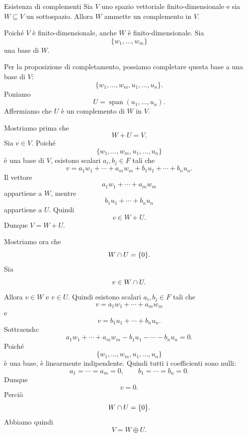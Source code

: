 \documentclass[a4paper]{article}
\begin{document}
\begin{snippetproposition}{Esistenza di complementi}
    Sia \(V\) uno spazio vettoriale finito-dimensionale e sia \(W\subseteq V\) un sottospazio. Allora \(W\) ammette un complemento in \(V\).
\end{snippetproposition}

\begin{snippetproof}{}
    Poiché \(V\) è finito-dimensionale, anche \(W\) è finito-dimensionale. Sia
    \[
        \{w_1,\ldots,w_m\}
    \]
    una base di \(W\).

    Per la proposizione di completamento, possiamo completare questa base a una base di \(V\):
    \[
        \{w_1,\ldots,w_m,u_1,\ldots,u_n\}.
    \]
    Poniamo
    \[
        U=\operatorname{span}(u_1,\ldots,u_n).
    \]
    Affermiamo che \(U\) è un complemento di \(W\) in \(V\).

    Mostriamo prima che
    \[
        W+U=V.
    \]
    Sia \(v\in V\). Poiché
    \[
        \{w_1,\ldots,w_m,u_1,\ldots,u_n\}
    \]
    è una base di \(V\), esistono scalari \(a_i,b_j\in F\) tali che
    \[
        v=a_1w_1+\cdots+a_mw_m+b_1u_1+\cdots+b_nu_n.
    \]
    Il vettore
    \[
        a_1w_1+\cdots+a_mw_m
    \]
    appartiene a \(W\), mentre
    \[
        b_1u_1+\cdots+b_nu_n
    \]
    appartiene a \(U\). Quindi
    \[
        v\in W+U.
    \]
    Dunque \(V=W+U\).

    Mostriamo ora che
    \[
        W\cap U=\{0\}.
    \]
    Sia
    \[
        v\in W\cap U.
    \]
    Allora \(v\in W\) e \(v\in U\). Quindi esistono scalari \(a_i,b_j\in F\) tali che
    \[
        v=a_1w_1+\cdots+a_mw_m
    \]
    e
    \[
        v=b_1u_1+\cdots+b_nu_n.
    \]
    Sottraendo:
    \[
        a_1w_1+\cdots+a_mw_m-b_1u_1-\cdots-b_nu_n=0.
    \]
    Poiché
    \[
        \{w_1,\ldots,w_m,u_1,\ldots,u_n\}
    \]
    è una base, è linearmente indipendente. Quindi tutti i coefficienti sono nulli:
    \[
        a_1=\cdots=a_m=0,
        \qquad
        b_1=\cdots=b_n=0.
    \]
    Dunque
    \[
        v=0.
    \]
    Perciò
    \[
        W\cap U=\{0\}.
    \]
    Abbiamo quindi
    \[
        V=W\oplus U.
    \]
\end{snippetproof}
\end{document}
